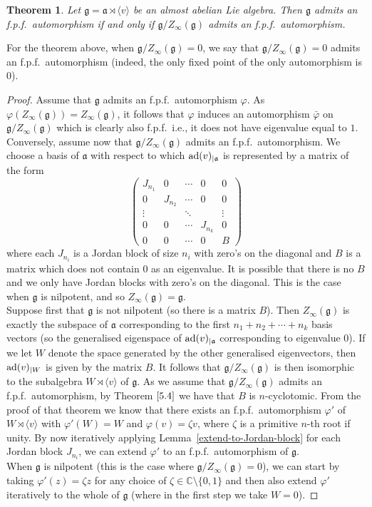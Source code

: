 \documentclass[12pt]{amsart}
\newtheorem{thm}{Theorem}[section]
\theoremstyle{definition}
\theoremstyle{remark}
\newcommand{\C}{\mathbb{C}}
\newcommand{\ad}{{\rm ad}}
\newcommand{\La}{\mathfrak{a}}
\newcommand{\Lg}{\mathfrak{g}}
\begin{document}
\begin{thm} Let $\Lg=\La \rtimes \langle v \rangle$ be an almost abelian Lie algebra. Then $\Lg$ admits an f.p.f.\ automorphism
if and only if $\Lg/Z_\infty(\Lg)$ admits an f.p.f.\ automorphism. 
\end{thm}

For the theorem above, when $\Lg/Z_\infty(\Lg)=0$, we say that  $\Lg/Z_\infty(\Lg)=0$ admits an f.p.f.\ automorphism (indeed, the
only fixed point of the only automorphism is $0$). 

\begin{proof}
Assume that $\Lg$ admits an f.p.f.\ automorphism $\varphi$. As $\varphi(Z_\infty(\Lg)) = Z_\infty(\Lg)$, it follows that
$\varphi$ induces an automorphism $\bar\varphi$ on $\Lg/Z_\infty(\Lg)$ which is clearly also f.p.f.\, i.e., it does not have eigenvalue
equal to $1$. \\[0.2cm]
Conversely, assume now that $\Lg/Z_\infty(\Lg)$ admits an f.p.f.\ automorphism. We choose a basis of $\La$ with respect
to which $\ad(v)_{|\La}$ is represented by a matrix of the form 
\[ \begin{pmatrix} 
J_{n_1} & 0 & \cdots & 0 & 0 \\
0 & J_{n_2} & \cdots & 0 & 0 \\
\vdots & & \ddots & & \vdots \\
0 & 0 & \cdots & J_{n_k} & 0 \\
0 & 0 & \cdots & 0 & B
\end{pmatrix}\]
where each $J_{n_i}$ is a Jordan block of size $n_i$ with zero's on the diagonal and $B$ is a matrix which does
not contain $0$ as an eigenvalue. It is possible that there is no $B$ and we only have Jordan blocks with zero's on
the diagonal. This is the case when $\Lg$ is nilpotent, and so $Z_\infty(\Lg)=\Lg$. \\[0.2cm]
Suppose first that $\Lg$ is not nilpotent (so there is a matrix $B$). Then $Z_\infty(\Lg)$ is exactly the subspace of $\La$
corresponding to the first $n_1 + n_2 + \cdots + n_k$ basis vectors (so the generalised eigenspace of $\ad(v)_{|\La}$ corresponding
to eigenvalue $0$). If we let $W$ denote the space generated by the other generalised eigenvectors, then $\ad(v)_{| W} $ is given
by the matrix $B$. It follows that $\Lg/Z_\infty(\Lg)$ is then isomorphic to the subalgebra
$W \rtimes \langle v \rangle $ of $\Lg$. 
As we assume that $\Lg/Z_\infty(\Lg)$ admits an f.p.f.\ automorphism, by Theorem $\ref{5.4}$ we have that $B$ is $n$-cyclotomic.
From the proof of that theorem we know that there exists an f.p.f.\ automorphism $\varphi'$ of
$W \rtimes \langle v \rangle$ with $\varphi'(W)=W$ and $\varphi(v)=\zeta v$, where $\zeta$ is a primitive $n$-th root if unity. 
By now iteratively applying Lemma~\ref{extend-to-Jordan-block} for each Jordan block $J_{n_i}$, we can extend $\varphi'$ to
an f.p.f.\ automorphism of $\Lg$. \\[0.2cm]
When $\Lg$ is nilpotent (this is the case where $\Lg/Z_\infty(\Lg)=0$), we can start by taking $\varphi'(z) =\zeta z$ for
any choice of $\zeta \in \C\setminus\{0,1\}$ and then also extend $\varphi'$ iteratively to the whole of $\Lg$
(where in the first step we take $W=0$).
\end{proof}
\end{document}
